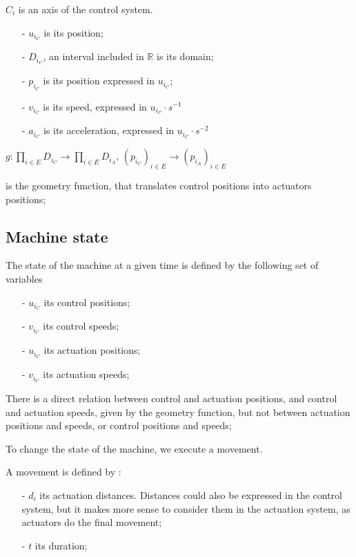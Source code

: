 $C_i$ is an axis of the control system.
\begin{itemize}
    \item[-] $u_{i_C}$ is its position;
    \item[-] $D_{i_C}$, an interval included in $\mathbb{R}$ is its domain;
    \item[-] $p_{i_C}$ is its position expressed in $u_{i_C}$;
    \item[-] $v_{i_C}$ is its speed, expressed in $u_{i_C} \cdot s^{-1}$
    \item[-] $a_{i_C}$ is its acceleration, expressed in $u_{i_C} \cdot s^{-2}$\newline
\end{itemize}

$g :  \prod\limits_{i\in E} D_{i_C} \rightarrow \prod\limits_{i\in E} D_{i_A} $,
$ (p_{i_C})_{i \in E}\rightarrow (p_{i_A})_{i \in E}$\newline

is the geometry function, that translates control positions into actuators positions;


\newpage

\subsection{Machine state}

The state of the machine at a given time is defined by the following set of variables

\begin{itemize}
    \item[-] $u_{i_C}$ its control positions;
    \item[-] $v_{i_C}$ its control speeds;
    \item[-] $u_{i_C}$ its actuation positions;
    \item[-] $v_{i_C}$ its actuation speeds;
\end{itemize}

There is a direct relation between control and actuation positions, and control and actuation speeds, given by
the geometry function, but not between actuation positions and speeds, or control positions and speeds;\newline

To change the state of the machine, we execute a movement.\newline

A movement is defined by :
\begin{itemize}
    \item[-] $d_i$ its actuation distances. Distances could also be expressed in the control system,
    but it makes more sense to consider them in the actuation system, as actuators do the final
    movement;
    \item[-] $t$ its duration;
\end{itemize}


